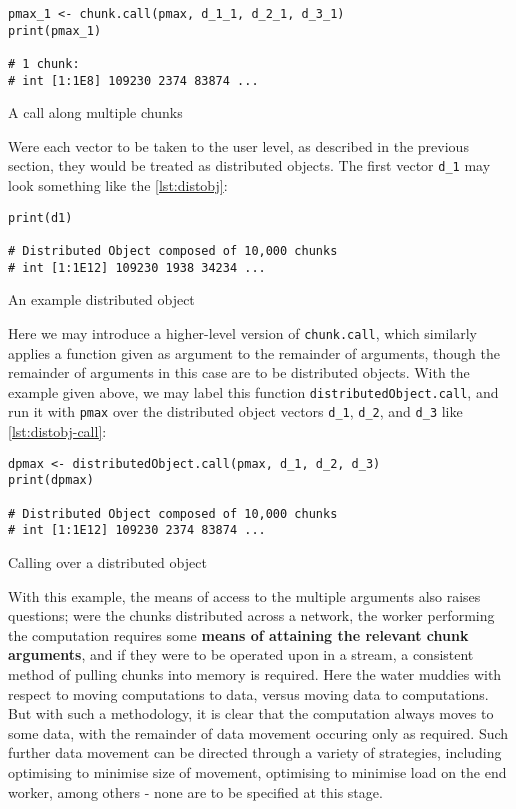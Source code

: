 \begin{listing}
    \begin{verbatim}
pmax_1 <- chunk.call(pmax, d_1_1, d_2_1, d_3_1)
print(pmax_1)

# 1 chunk:
# int [1:1E8] 109230 2374 83874 ...
    \end{verbatim}
    \caption{A call along multiple chunks}
    \label{lst:call-along-chunks}
\end{listing}

Were each vector to be taken to the user level, as described in the
previous section, they would be treated as distributed objects. The
first vector \texttt{d\_1} may look something like the \cref{lst:distobj}:

\begin{listing}
    \begin{verbatim}
print(d1)

# Distributed Object composed of 10,000 chunks
# int [1:1E12] 109230 1938 34234 ...
    \end{verbatim}
    \caption{An example distributed object}
    \label{lst:distobj}
\end{listing}

Here we may introduce a higher-level version of \texttt{chunk.call},
which similarly applies a function given as argument to the remainder of
arguments, though the remainder of arguments in this case are to be
distributed objects. With the example given above, we may label this
function \texttt{distributedObject.call}, and run it with \texttt{pmax}
over the distributed object vectors \texttt{d\_1}, \texttt{d\_2}, and
\texttt{d\_3} like \cref{lst:distobj-call}:

\begin{listing}
    \begin{verbatim}
dpmax <- distributedObject.call(pmax, d_1, d_2, d_3)
print(dpmax)

# Distributed Object composed of 10,000 chunks
# int [1:1E12] 109230 2374 83874 ...
    \end{verbatim}
    \caption{Calling over a distributed object}
    \label{lst:distobj-call}
\end{listing}

With this example, the means of access to the multiple arguments also
raises questions; were the chunks distributed across a network, the
worker performing the computation requires some \textbf{means of
    attaining the relevant chunk arguments}, and if they were to be operated
upon in a stream, a consistent method of pulling chunks into memory is
required. Here the water muddies with respect to moving computations to
data, versus moving data to computations. But with such a methodology,
it is clear that the computation always moves to some data, with the
remainder of data movement occuring only as required. Such further data
movement can be directed through a variety of strategies, including
optimising to minimise size of movement, optimising to minimise load on
the end worker, among others - none are to be specified at this stage.

